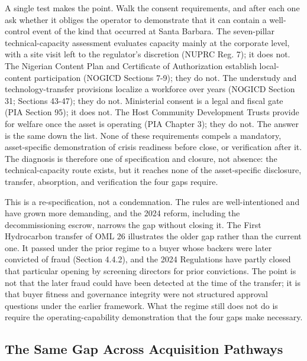 \documentclass[twoside,fontset=lmodern]{mitthesis}
\begin{document}
A single test makes the point. Walk the consent requirements, and after
each one ask whether it obliges the operator to demonstrate that it can
contain a well-control event of the kind that occurred at Santa Barbara.
The seven-pillar technical-capacity assessment evaluates capacity mainly
at the corporate level, with a site visit left to the regulator's
discretion (NUPRC Reg. 7); it does not. The Nigerian Content Plan and
Certificate of Authorization establish local-content participation
(NOGICD Sections 7-9); they do not. The understudy and
technology-transfer provisions localize a workforce over years (NOGICD
Section 31; Sections 43-47); they do not. Ministerial consent is a legal
and fiscal gate (PIA Section 95); it does not. The Host Community
Development Trusts provide for welfare once the asset is operating (PIA
Chapter 3); they do not. The answer is the same down the list. None of
these requirements compels a mandatory, asset-specific demonstration of
crisis readiness before close, or verification after it. The diagnosis
is therefore one of specification and closure, not absence: the
technical-capacity route exists, but it reaches none of the
asset-specific disclosure, transfer, absorption, and verification the
four gaps require.

This is a re-specification, not a condemnation. The rules are
well-intentioned and have grown more demanding, and the 2024 reform,
including the decommissioning escrow, narrows the gap without closing
it. The First Hydrocarbon transfer of OML 26 illustrates the older gap
rather than the current one. It passed under the prior regime to a buyer
whose backers were later convicted of fraud (Section 4.4.2), and the
2024 Regulations have partly closed that particular opening by screening
directors for prior convictions. The point is not that the later fraud
could have been detected at the time of the transfer; it is that buyer
fitness and governance integrity were not structured approval questions
under the earlier framework. What the regime still does not do is
require the operating-capability demonstration that the four gaps make
necessary.

\hypertarget{the-same-gap-across-acquisition-pathways}{%
\subsection{The Same Gap Across Acquisition
Pathways}\label{the-same-gap-across-acquisition-pathways}}
\end{document}
